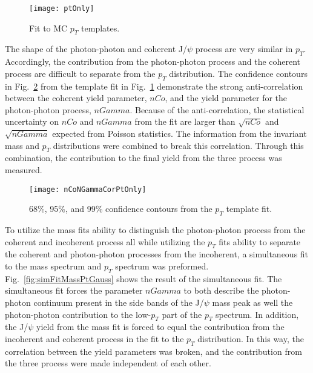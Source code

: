     \begin{figure}[!Hhbt]
      \centering
      \texttt{[image: ptOnly]}
      \caption{ Fit to MC $p_{T}$ templates. }
      \label{fig:ptTemps}
    \end{figure}

    The shape of the photon-photon and coherent J/$\psi$ process are very 
      similar in $p_{T}$.
    Accordingly, the contribution from the photon-photon process and the 
      coherent process are difficult to separate from the $p_{T}$ distribution.
    The confidence contours in Fig.~\ref{fig:ptOnlyCor} from the template fit
      in Fig.~\ref{fig:ptTemps} demonstrate the strong anti-correlation 
      between the coherent yield parameter, $nCo$, and the yield parameter 
      for the photon-photon process, $nGamma$.
    Because of the anti-correlation, the statistical uncertainty on $nCo$ and 
      $nGamma$ from the fit are larger than $\sqrt{nCo}$ and $\sqrt{nGamma}$
      expected from Poisson statistics. 
    The information from the invariant mass and $p_{T}$ distributions were
      combined to break this correlation. 
    Through this combination, the contribution to the final yield from 
      the three process was measured.

    \begin{figure}[!Hhbt]
      \centering
      \texttt{[image: nCoNGammaCorPtOnly]}
      \caption{68\%, 95\%, and 99\% confidence contours from the $p_{T}$ 
        template fit. }
      \label{fig:ptOnlyCor}
    \end{figure}

    To utilize the mass fits ability to distinguish the photon-photon process 
      from the coherent and incoherent process all while utilizing the $p_{T}$
      fits ability to separate the coherent and photon-photon processes from 
      the incoherent, a simultaneous fit to the mass spectrum and $p_{T}$ 
      spectrum was preformed.
    Fig.~\ref{fig:simFitMassPtGauss} shows the result of the simultaneous fit.
    The simultaneous fit forces the parameter $nGamma$ to both describe the 
      photon-photon continuum present in the side bands of the J/$\psi$ mass 
      peak as well the photon-photon contribution to the low-$p_{T}$ part of 
      the $p_{T}$ spectrum.
    In addition, the J/$\psi$ yield from the mass fit is forced to equal the
      contribution from the incoherent and coherent process in the 
      fit to the $p_{T}$ distribution. 
    In this way, the correlation between the yield parameters was broken, and 
      the contribution from the three process were made independent of each 
      other.

